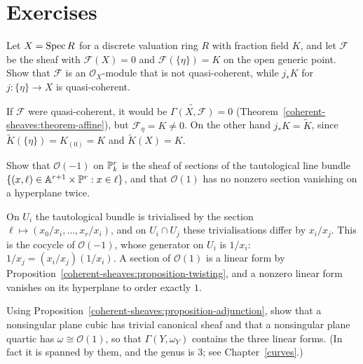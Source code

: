 \section{Exercises}\label{coherent-sheaves:section-exercises}

\begin{exercise}\label{coherent-sheaves:exercise-not-quasi-coherent}
Let $X = \operatorname{Spec} R$ for a discrete valuation ring $R$ with fraction field $K$, and let $\mathcal{F}$ be the sheaf with $\mathcal{F}(X) = 0$ and $\mathcal{F}(\{\eta\}) = K$ on
the open generic point. Show that $\mathcal{F}$ is an $\mathcal{O}_X$-module that is not quasi-coherent, while $j_*K$ for $j \colon \{\eta\} \to X$ is quasi-coherent.
\end{exercise}

\begin{solution}
If $\mathcal{F}$ were quasi-coherent, it would be $\widetilde{\Gamma(X, \mathcal{F})} = 0$ (Theorem~\ref{coherent-sheaves:theorem-affine}), but $\mathcal{F}_\eta = K \neq 0$.
On the other hand $j_*K = \widetilde K$, since $\widetilde K(\{\eta\}) = K_{(0)} = K$ and $\widetilde K(X) = K$.
\end{solution}

\begin{exercise}\label{coherent-sheaves:exercise-o-minus-one}
Show that $\mathcal{O}(-1)$ on $\mathbb{P}^r_k$ is the sheaf of sections of the tautological line bundle
$\{(x, \ell) \in \mathbb{A}^{r+1} \times \mathbb{P}^r : x \in \ell\}$, and that $\mathcal{O}(1)$ has no nonzero section vanishing on a hyperplane twice.
\end{exercise}

\begin{solution}
On $U_i$ the tautological bundle is trivialised by the section $\ell \mapsto (x_0/x_i, \ldots, x_r/x_i)$, and on $U_i \cap U_j$ these trivialisations differ by
$x_i/x_j$. This is the cocycle of $\mathcal{O}(-1)$, whose generator on $U_i$ is $1/x_i$: $1/x_j = (x_i/x_j)(1/x_i)$. A section of $\mathcal{O}(1)$ is a linear form
by Proposition~\ref{coherent-sheaves:proposition-twisting}, and a nonzero linear form vanishes on its hyperplane to order exactly $1$.
\end{solution}

\begin{exercise}\label{coherent-sheaves:exercise-canonical-curves}
Using Proposition~\ref{coherent-sheaves:proposition-adjunction}, show that a nonsingular plane cubic has trivial canonical sheaf and that a nonsingular plane
quartic has $\omega \cong \mathcal{O}(1)$, so that $\Gamma(Y, \omega_Y)$ contains the three linear forms. (In fact it is spanned by them, and the genus is
$3$; see Chapter~\ref{curves}.)
\end{exercise}

